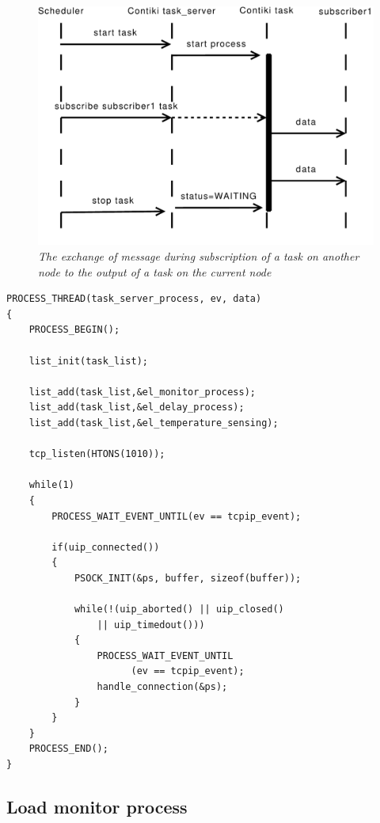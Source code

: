 \begin{figure}[ht]
 \begin{center}
  \includegraphics[scale=0.5]{implementation/subscribe.pdf}
 \end{center}
 \caption{\small \itshape{The exchange of message during subscription of a task on another node to the output of a task on the current node}}
\end{figure}

\lstset{numbers=left, mathescape=true, nolol=false,caption=Task server snippet,label=lst:taskserver}
\begin{lstlisting}
PROCESS_THREAD(task_server_process, ev, data)
{
	PROCESS_BEGIN();

	list_init(task_list);

	list_add(task_list,&el_monitor_process);
	list_add(task_list,&el_delay_process);
	list_add(task_list,&el_temperature_sensing);

	tcp_listen(HTONS(1010));

	while(1) 
	{
		PROCESS_WAIT_EVENT_UNTIL(ev == tcpip_event);

		if(uip_connected()) 
		{
			PSOCK_INIT(&ps, buffer, sizeof(buffer));

			while(!(uip_aborted() || uip_closed() 
			    || uip_timedout())) 
			{
				PROCESS_WAIT_EVENT_UNTIL
				      (ev == tcpip_event);
				handle_connection(&ps);
			}
		}
	}
	PROCESS_END();
}
\end{lstlisting}
\subsection{Load monitor process}

